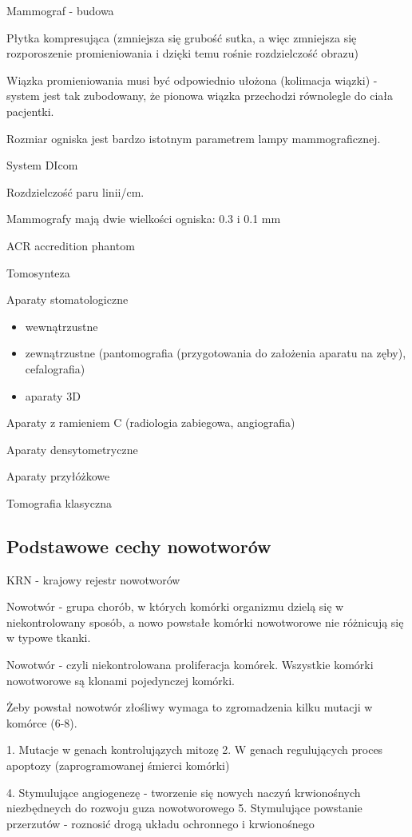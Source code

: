 \documentclass{article}
\begin{document}
Mammograf - budowa

Płytka kompresująca (zmniejsza się grubość sutka, a więc zmniejsza się rozporoszenie promieniowania i dzięki temu rośnie rozdzielczość obrazu)

Wiązka promieniowania musi być odpowiednio ułożona (kolimacja wiązki) - system jest tak zubodowany, że pionowa wiązka przechodzi równolegle do ciała pacjentki.

Rozmiar ogniska jest bardzo istotnym parametrem lampy mammograficznej.

System DIcom

Rozdzielczość paru linii\slash cm.

Mammografy mają dwie wielkości ogniska: 0.3 i 0.1 mm

ACR accredition phantom

Tomosynteza

Aparaty stomatologiczne
\begin{itemize}
    \item wewnątrzustne
    \item zewnątrzustne (pantomografia (przygotowania do założenia aparatu na zęby), cefalografia)
    \item aparaty 3D
\end{itemize}

Aparaty z ramieniem C (radiologia zabiegowa, angiografia)

Aparaty densytometryczne

Aparaty przyłóżkowe

Tomografia klasyczna

\subsection{Podstawowe cechy nowotworów}

KRN - krajowy rejestr nowotworów

Nowotwór - grupa chorób, w których komórki organizmu dzielą się w niekontrolowany sposób, a nowo powstałe komórki nowotworowe nie różnicują się w typowe tkanki.

Nowotwór - czyli niekontrolowana proliferacja komórek. Wszystkie komórki nowotworowe są klonami pojedynczej komórki.

Żeby powstał nowotwór złośliwy wymaga to zgromadzenia kilku mutacji w komórce (6-8).

1. Mutacje w genach kontrolujązych mitozę
2. W genach regulujących proces apoptozy (zaprogramowanej śmierci komórki)

4. Stymulujące angiogenezę - tworzenie się nowych naczyń krwionośnych niezbędneych do rozwoju guza nowotworowego
5. Stymulujące powstanie przerzutów - roznosić drogą układu ochronnego i krwionośnego
\end{document}
